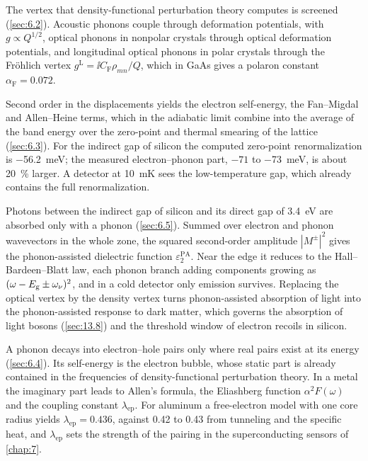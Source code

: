 The vertex that density-functional perturbation theory computes is screened (\cref{sec:6.2}). Acoustic phonons couple through deformation potentials, with $g \propto Q^{1/2}$, optical phonons in nonpolar crystals through optical deformation potentials, and longitudinal optical phonons in polar crystals through the Fr\"ohlich vertex $g^{\mathrm{L}} = \ii C_{\mathrm{F}}\rho_{mn}/Q$, which in GaAs gives a polaron constant $\alpha_{\mathrm{F}} = 0.072$.

Second order in the displacements yields the electron self-energy, the Fan--Migdal and Allen--Heine terms, which in the adiabatic limit combine into the average of the band energy over the zero-point and thermal smearing of the lattice (\cref{sec:6.3}). For the indirect gap of silicon the computed zero-point renormalization is \SI{-56.2}{meV}; the measured electron--phonon part, $-71$ to \SI{-73}{meV}, is about \SI{20}{\percent} larger. A detector at \SI{10}{mK} sees the low-temperature gap, which already contains the full renormalization.

Photons between the indirect gap of silicon and its direct gap of \SI{3.4}{eV} are absorbed only with a phonon (\cref{sec:6.5}). Summed over electron and phonon wavevectors in the whole zone, the squared second-order amplitude $|M^\pm|^2$ gives the phonon-assisted dielectric function $\varepsilon_2^{\mathrm{PA}}$. Near the edge it reduces to the Hall--Bardeen--Blatt law, each phonon branch adding components growing as $(\omega - E_{\mathrm{g}} \pm \omega_\nu)^2$, and in a cold detector only emission survives. Replacing the optical vertex by the density vertex turns phonon-assisted absorption of light into the phonon-assisted response to dark matter, which governs the absorption of light bosons (\cref{sec:13.8}) and the threshold window of electron recoils in silicon.

A phonon decays into electron--hole pairs only where real pairs exist at its energy (\cref{sec:6.4}). Its self-energy is the electron bubble, whose static part is already contained in the frequencies of density-functional perturbation theory. In a metal the imaginary part leads to Allen's formula, the Eliashberg function $\alpha^2F(\omega)$ and the coupling constant $\lambda_{\mathrm{ep}}$. For aluminum a free-electron model with one core radius yields $\lambda_{\mathrm{ep}} = 0.436$, against 0.42 to 0.43 from tunneling and the specific heat, and $\lambda_{\mathrm{ep}}$ sets the strength of the pairing in the superconducting sensors of \cref{chap:7}.
